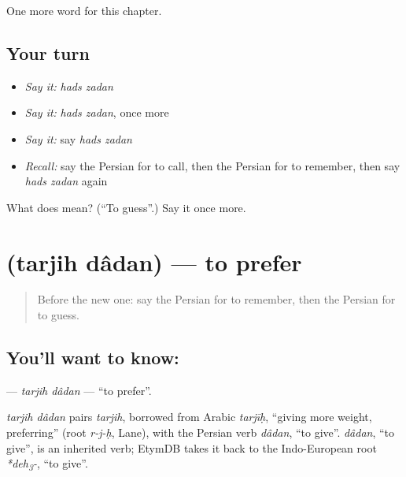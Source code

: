 \begin{grammarlens}[title={What you've built}]
One more word for this chapter.
\end{grammarlens}

\subsection*{Your turn}
\begin{itemize}
\raggedright
  \item \emph{Say it:} \emph{hads zadan}
  \item \emph{Say it:} \emph{hads zadan}, once more
  \item \emph{Say it:} say \emph{hads zadan}
  \item \emph{Recall:} say the Persian for to call, then the Persian for to remember, then say \emph{hads zadan} again
\end{itemize}

\begin{tcolorbox}[breakable,colback=teal!4,colframe=teal!35!black,title={Before you move on}]
What does   mean? (\textquotedblleft{}To guess\textquotedblright{}.) Say it once more.
\end{tcolorbox}
\section[\texorpdfstring{\fa{ترجیح} \fa{دادن} (tarjih dâdan)}{ترجیح دادن (tarjih dâdan)}]{  (tarjih dâdan) — to prefer}

\label{lesson:FA-C146-tarjih-dadan}



\begin{quote}
Before the new one: say the Persian for to remember, then the Persian for to guess.
\end{quote}

\subsection*{You'll want to know:  }
\textbf{ } — \emph{tarjih dâdan} — \textquotedblleft{}to prefer\textquotedblright{}.

\begin{cousinweb}
\emph{tarjih dâdan} pairs \emph{tarjih}, borrowed from Arabic \emph{tarjīḥ}, \textquotedblleft{}giving more weight, preferring\textquotedblright{} (root \emph{r-j-ḥ}, Lane), with the Persian verb \emph{dâdan}, \textquotedblleft{}to give\textquotedblright{}. \emph{dâdan}, \textquotedblleft{}to give\textquotedblright{}, is an inherited verb; EtymDB takes it back to the Indo-European root \emph{*deh\textsubscript{3}-}, \textquotedblleft{}to give\textquotedblright{}.
\end{cousinweb}

